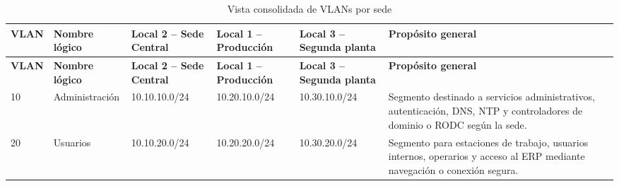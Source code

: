 \documentclass[11pt, a4paper, oneside]{report}
\begin{document}
\begin{landscape}
\thispagestyle{fancy}

\renewcommand{\arraystretch}{1.3}
\footnotesize
{}

\begin{xltabular}{\linewidth}{@{}|N{1.5cm}|L{2.6cm}|L{3.5cm}|L{3.5cm}|L{3.5cm}|X|@{}}
\caption{Vista consolidada de VLANs por sede}
\label{tab:vista_consolidada_vlans_sede} \\

\parbox[c][1.1cm][c]{\linewidth}{\centering\color{white}\bfseries\small VLAN} &
\parbox[c][1.1cm][c]{\linewidth}{\centering\color{white}\bfseries\small Nombre lógico} &
\parbox[c][1.1cm][c]{\linewidth}{\centering\color{white}\bfseries\small Local 2 -- Sede Central} &
\parbox[c][1.1cm][c]{\linewidth}{\centering\color{white}\bfseries\small Local 1 -- Producción} &
\parbox[c][1.1cm][c]{\linewidth}{\centering\color{white}\bfseries\small Local 3 -- Segunda planta} &
\parbox[c][1.1cm][c]{\linewidth}{\centering\color{white}\bfseries\small Propósito general} \\ \hline
\endfirsthead

\parbox[c][1.1cm][c]{\linewidth}{\centering\color{white}\bfseries\small VLAN} &
\parbox[c][1.1cm][c]{\linewidth}{\centering\color{white}\bfseries\small Nombre lógico} &
\parbox[c][1.1cm][c]{\linewidth}{\centering\color{white}\bfseries\small Local 2 -- Sede Central} &
\parbox[c][1.1cm][c]{\linewidth}{\centering\color{white}\bfseries\small Local 1 -- Producción} &
\parbox[c][1.1cm][c]{\linewidth}{\centering\color{white}\bfseries\small Local 3 -- Segunda planta} &
\parbox[c][1.1cm][c]{\linewidth}{\centering\color{white}\bfseries\small Propósito general} \\ \hline
\endhead

\hline
\endfoot

{\small 10} &
{\small Administración} &
{\small 10.10.10.0/24} &
{\small 10.20.10.0/24} &
{\small 10.30.10.0/24} &
{\small Segmento destinado a servicios administrativos, autenticación, DNS, NTP y controladores de dominio o RODC según la sede.} \\ \hline

{\small 20} &
{\small Usuarios} &
{\small 10.10.20.0/24} &
{\small 10.20.20.0/24} &
{\small 10.30.20.0/24} &
{\small Segmento para estaciones de trabajo, usuarios internos, operarios y acceso al ERP mediante navegación o conexión segura.} \\ \hline


\end{xltabular}
\end{landscape}
\end{document}
